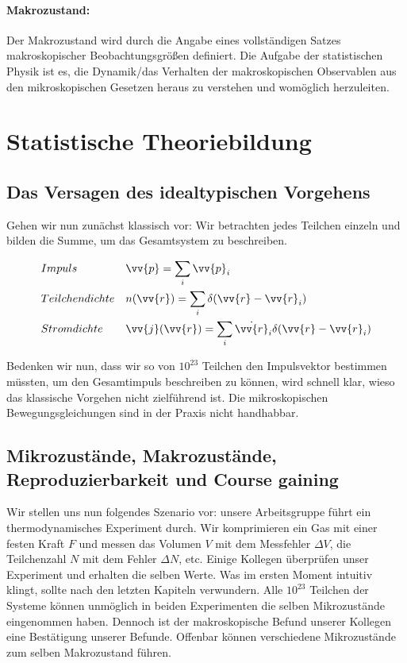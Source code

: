 \paragraph{Makrozustand:} Der Makrozustand wird durch die Angabe eines vollständigen
Satzes makroskopischer Beobachtungsgrößen definiert. Die Aufgabe der statistischen
Physik ist es, die Dynamik/das Verhalten der makroskopischen Observablen aus den
mikroskopischen Gesetzen heraus zu verstehen und womöglich herzuleiten.

    \section{Statistische Theoriebildung}
    \subsection{Das Versagen des idealtypischen Vorgehens}

Gehen wir nun zunächst klassisch vor: Wir betrachten jedes Teilchen einzeln und
bilden die Summe, um das Gesamtsystem zu beschreiben.

\begin{align*}
    &Impuls             & & \vv{p} = \sum_i \vv{p}_i\\
    &Teilchendichte     & & n( \vv{r}) = \sum_i \delta( \vv{r} - \vv{r}_i)\\
    &Stromdichte        & & \vv{j} (\vv{r}) = \sum_i \dot{\vv{r}}_i
                            \delta( \vv{r} - \vv{r}_i)
 \end{align*}

Bedenken wir nun, dass wir so von $10^{23}$ Teilchen den Impulsvektor bestimmen
müssten, um den Gesamtimpuls beschreiben zu können, wird schnell klar, wieso
das klassische Vorgehen nicht zielführend ist. Die mikroskopischen
Bewegungsgleichungen sind in der Praxis nicht handhabbar.

    \subsection{Mikrozustände, Makrozustände, Reproduzierbarkeit und Course
                gaining}

Wir stellen uns nun folgendes Szenario vor: unsere Arbeitsgruppe führt ein
thermodynamisches Experiment durch. Wir komprimieren ein Gas mit einer festen
Kraft $F$ und messen das Volumen $V$ mit dem Messfehler $\Delta V$, die
Teilchenzahl $N$ mit dem Fehler $\Delta N$, etc. Einige Kollegen überprüfen unser
Experiment und erhalten die selben Werte. Was im ersten Moment intuitiv klingt,
sollte nach den letzten Kapiteln verwundern. Alle $10^{23}$ Teilchen der Systeme
können unmöglich in beiden Experimenten die selben Mikrozustände eingenommen haben.
Dennoch ist der makroskopische Befund unserer Kollegen eine Bestätigung unserer
Befunde. Offenbar können verschiedene Mikrozustände zum selben Makrozustand führen.


